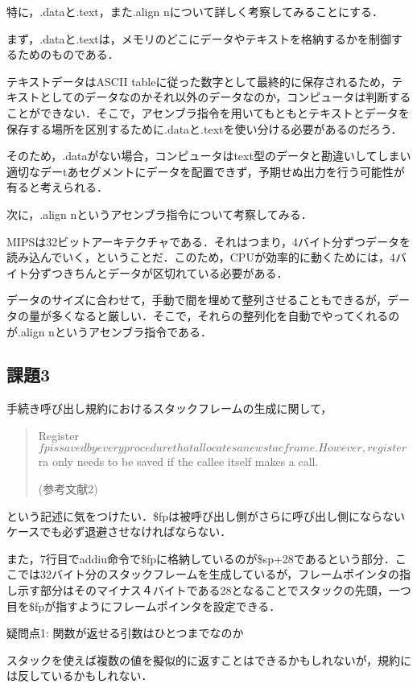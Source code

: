 \documentclass[a4j]{jarticle}
\begin{document}
特に，.dataと.text，また.align nについて詳しく考察してみることにする．

まず，.dataと.textは，メモリのどこにデータやテキストを格納するかを制御するためのものである．

テキストデータはASCII tableに従った数字として最終的に保存されるため，テキストとしてのデータなのかそれ以外のデータなのか，コンピュータは判断することができない．そこで，アセンブラ指令を用いてもともとテキストとデータを保存する場所を区別するために.dataと.textを使い分ける必要があるのだろう．

そのため，.dataがない場合，コンピュータはtext型のデータと勘違いしてしまい適切なデーtあセグメントにデータを配置できず，予期せぬ出力を行う可能性が有ると考えられる．

次に，.align nというアセンブラ指令について考察してみる．

MIPSは32ビットアーキテクチャである．それはつまり，4バイト分ずつデータを読み込んでいく，ということだ．このため，CPUが効率的に動くためには，4バイト分ずつきちんとデータが区切れている必要がある．

データのサイズに合わせて，手動で間を埋めて整列させることもできるが，データの量が多くなると厳しい．そこで，それらの整列化を自動でやってくれるのが.align nというアセンブラ指令である．


\subsection{課題3}

手続き呼び出し規約におけるスタックフレームの生成に関して，

\begin{quote}
Register $fp is saved by every procedure that allocates a new stac frame. However, register $ra only needs to be saved if the callee itself makes a call.

(参考文献2)
\end{quote}

という記述に気をつけたい．\$fpは被呼び出し側がさらに呼び出し側にならないケースでも必ず退避させなければならない．

また，7行目でaddiu命令で\$fpに格納しているのが\$sp+28であるという部分．ここでは32バイト分のスタックフレームを生成しているが，フレームポインタの指し示す部分はそのマイナス４バイトである28となることでスタックの先頭，一つ目を\$fpが指すようにフレームポインタを設定できる．  


疑問点1: 関数が返せる引数はひとつまでなのか

スタックを使えば複数の値を擬似的に返すことはできるかもしれないが，規約には反しているかもしれない．
\end{document}
